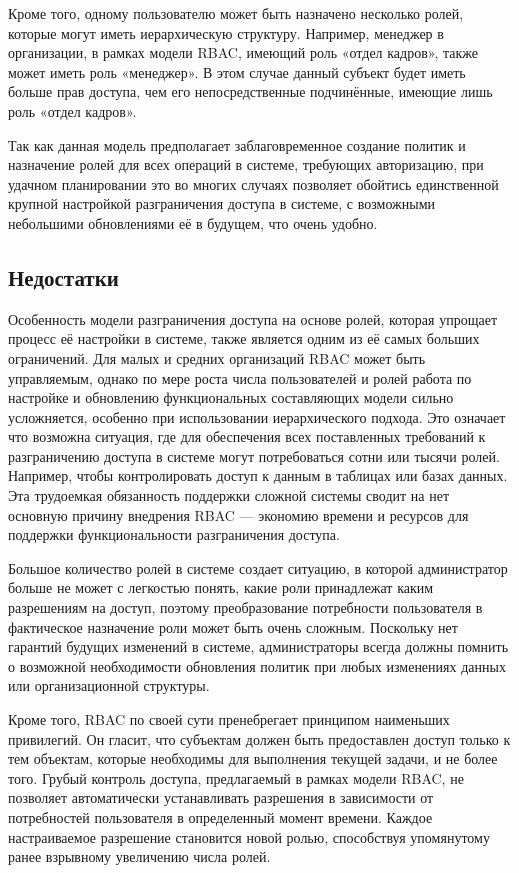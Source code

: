 \documentclass[a4paper,14pt]{article}
\begin{document}
Кроме того, одному пользователю может быть назначено несколько ролей, которые могут иметь иерархическую структуру. Например, менеджер в организации, в рамках модели RBAC, имеющий роль «отдел кадров», также может иметь роль «менеджер». В этом случае данный субъект будет иметь больше прав доступа, чем его непосредственные подчинённые, имеющие лишь роль «отдел кадров». 


Так как данная модель предполагает заблаговременное создание политик и назначение ролей для всех операций в системе, требующих авторизацию, при удачном планировании это во многих случаях позволяет обойтись единственной крупной настройкой разграничения доступа в системе, с возможными небольшими обновлениями её в будущем, что очень удобно. 



\subsection{Недостатки}

Особенность модели разграничения доступа на основе ролей, которая упрощает процесс её настройки в системе, также является одним из её самых больших ограничений. Для малых и средних организаций RBAC может быть управляемым, однако по мере роста числа пользователей и ролей работа по настройке и обновлению функциональных составляющих модели сильно усложняется, особенно при использовании иерархического подхода. Это означает что возможна ситуация, где для обеспечения всех поставленных требований к разграничению доступа в системе могут потребоваться сотни или тысячи ролей. Например, чтобы контролировать доступ к данным в таблицах или базах данных. Эта трудоемкая обязанность поддержки сложной системы сводит на нет основную причину внедрения RBAC — экономию времени и ресурсов для поддержки функциональности разграничения доступа. 


Большое количество ролей в системе создает ситуацию, в которой администратор больше не может с легкостью понять, какие роли принадлежат каким разрешениям на доступ, поэтому преобразование потребности пользователя в фактическое назначение роли может быть очень сложным. Поскольку нет гарантий будущих изменений в системе, администраторы всегда должны помнить о возможной необходимости обновления политик при любых изменениях данных или организационной структуры. 


Кроме того, RBAC по своей сути пренебрегает принципом наименьших привилегий. Он гласит, что субъектам должен быть предоставлен доступ только к тем объектам, которые необходимы для выполнения текущей задачи, и не более того. Грубый контроль доступа, предлагаемый в рамках модели RBAC, не позволяет автоматически устанавливать разрешения в зависимости от потребностей пользователя в определенный момент времени. Каждое настраиваемое разрешение становится новой ролью, способствуя упомянутому ранее взрывному увеличению числа ролей.
\end{document}

